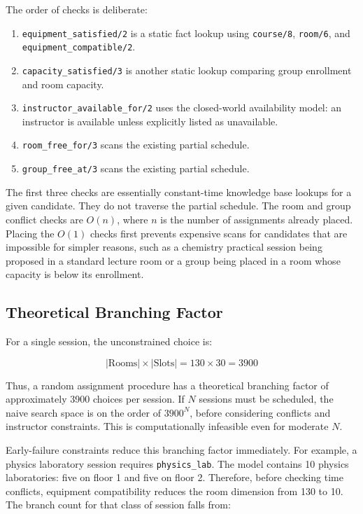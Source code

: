 \documentclass[12pt,a4paper]{article}
\newcommand{\predicate}[1]{\texttt{#1}}
\newcommand{\term}[1]{\texttt{#1}}
\begin{document}
The order of checks is deliberate:

\begin{enumerate}
    \item \predicate{equipment\_satisfied/2} is a static fact lookup using \predicate{course/8}, \predicate{room/6}, and \predicate{equipment\_compatible/2}.
    \item \predicate{capacity\_satisfied/3} is another static lookup comparing group enrollment and room capacity.
    \item \predicate{instructor\_available\_for/2} uses the closed-world availability model: an instructor is available unless explicitly listed as unavailable.
    \item \predicate{room\_free\_for/3} scans the existing partial schedule.
    \item \predicate{group\_free\_at/3} scans the existing partial schedule.
\end{enumerate}

The first three checks are essentially constant-time knowledge base lookups for a given candidate. They do not traverse the partial schedule. The room and group conflict checks are \(O(n)\), where \(n\) is the number of assignments already placed. Placing the \(O(1)\) checks first prevents expensive scans for candidates that are impossible for simpler reasons, such as a chemistry practical session being proposed in a standard lecture room or a group being placed in a room whose capacity is below its enrollment.

\subsection{Theoretical Branching Factor}

For a single session, the unconstrained choice is:

\[
    |\text{Rooms}| \times |\text{Slots}| = 130 \times 30 = 3900
\]

Thus, a random assignment procedure has a theoretical branching factor of approximately 3900 choices per session. If \(N\) sessions must be scheduled, the naive search space is on the order of \(3900^N\), before considering conflicts and instructor constraints. This is computationally infeasible even for moderate \(N\).

Early-failure constraints reduce this branching factor immediately. For example, a physics laboratory session requires \term{physics\_lab}. The model contains 10 physics laboratories: five on floor 1 and five on floor 2. Therefore, before checking time conflicts, equipment compatibility reduces the room dimension from 130 to 10. The branch count for that class of session falls from:
\end{document}
